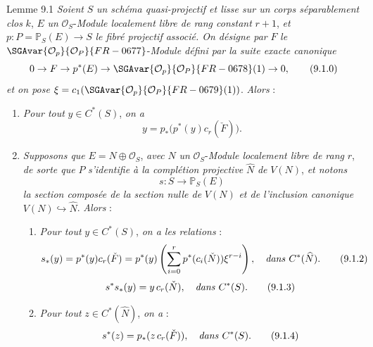 \begin{statement}{Lemme 9.1}
\emph{Soient} $S$ \emph{un schéma quasi-projectif et lisse sur un corps séparablement clos} $k$, $E$ \emph{un} $\mathcal{O}_S$-\emph{Module localement libre de rang constant} $r+1$, \emph{et} $p:P=\mathbb{P}_S(E)\to S$ \emph{le fibré projectif associé. On désigne par} $F$ \emph{le} $\SGAvar{\mathcal{O}_p}{\mathcal{O}_P}{FR-0677}$-\emph{Module défini par la suite exacte canonique}
\[
0\to F\to p^*(E)\to\SGAvar{\mathcal{O}_p}{\mathcal{O}_P}{FR-0678}(1)\to0,
\tag{9.1.0}
\]
\emph{et on pose} $\xi=c_1(\SGAvar{\mathcal{O}_p}{\mathcal{O}_P}{FR-0679}(1))$. \emph{Alors} :
\begin{enumerate}[label=(\roman*)]
\item \emph{Pour tout} $y\in C^*(S)$, \emph{on a}
\[
y=p_*\bigl(p^*(y)c_r(\check F)\bigr).
\tag{9.1.1}
\]
\item \emph{Supposons que} $E=N\oplus\mathcal{O}_S$, \emph{avec} $N$ \emph{un} $\mathcal{O}_S$-\emph{Module localement libre de rang} $r$, \emph{de sorte que} $P$ \emph{s'identifie à la complétion projective} $\widehat N$ \emph{de} $V(N)$, \emph{et notons}
\[
s:S\to\mathbb{P}_S(E)
\]
\emph{la section composée de la section nulle de} $V(N)$ \emph{et de l'inclusion canonique} $V(N)\hookrightarrow\widehat N$. \emph{Alors} :
\begin{enumerate}[label=(\alph*)]
\item \emph{Pour tout} $y\in C^*(S)$, \emph{on a les relations} :
\[
s_*(y)=p^*(y)c_r(\check F)=p^*(y)\left(\sum_{i=0}^r p^*(c_i(\check N))\xi^{r-i}\right),
\quad\text{\emph{dans} }C^*(\widehat N).
\tag{9.1.2}
\]
\[
s^*s_*(y)=y\,c_r(\check N),\quad\text{\emph{dans} }C^*(S).
\tag{9.1.3}
\]
\item
\emph{Pour tout} $z\in C^*(\widehat N)$, \emph{on a} :
\[
s^*(z)=p_*(z\,c_r(\check F)),\quad\text{\emph{dans} }C^*(S).
\tag{9.1.4}
\]
\end{enumerate}
\end{enumerate}
\end{statement}

